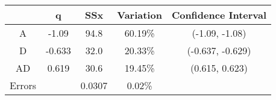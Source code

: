 \begin{center}
\begin{tabular}{|c|c|c|c|c|}
\cline{2-5}
\multicolumn{1}{c|}{} & q & SSx & Variation & Confidence Interval \\
\hline
A&-1.09&94.8&60.19\% &(-1.09, -1.08) \\
\hline
D&-0.633&32.0&20.33\% &(-0.637, -0.629) \\
\hline
AD&0.619&30.6&19.45\% &(0.615, 0.623) \\
\hline
Errors& &0.0307&0.02\% & \\
\hline
\end{tabular}
\end{center}
